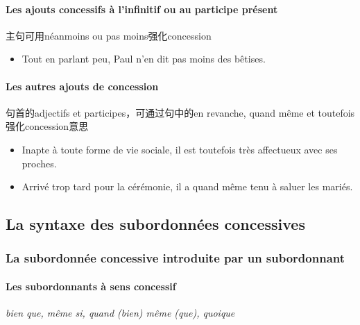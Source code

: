 \documentclass[UTF8]{report}
\begin{document}
\paragraph{Les ajouts concessifs à l’infinitif ou au participe présent}
主句可用néanmoins ou pas moins强化concession
\begin{itemize}
    \item Tout en parlant peu, Paul n’en dit pas moins des bêtises.
\end{itemize}

\paragraph{Les autres ajouts de concession}
句首的adjectifs et participes，可通过句中的en revanche, quand même et toutefois强化concession意思
\begin{itemize}
    \item Inapte à toute forme de vie sociale, il est toutefois très affectueux avec ses proches.
    \item Arrivé trop tard pour la cérémonie, il a quand même tenu à saluer les mariés.
\end{itemize}

\subsection{La syntaxe des subordonnées concessives}
\subsubsection{La subordonnée concessive introduite par un subordonnant
}

\paragraph{Les subordonnants à sens concessif}
\textit{bien que, même si, quand (bien) même (que), quoique}
\end{document}
